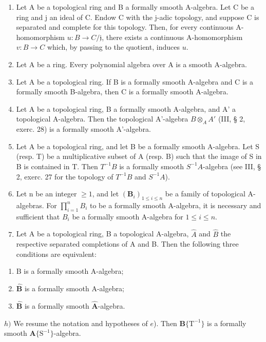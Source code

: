 \begin{enumerate}
\def\labelenumi{\alph{enumi})}
\item
  Let A be a topological ring and B a formally smooth A-algebra. Let C be a ring and j an ideal of C. Endow C with the j-adic topology, and suppose C is separated and complete for this topology. Then, for every continuous A-homomorphism \(u:B\to C/\mathfrak{j}\), there exists a continuous A-homomorphism \(v:B\to C\) which, by passing to the quotient, induces \(u\).
\item
  Let A be a ring. Every polynomial algebra over A is a smooth A-algebra.
\item
  Let A be a topological ring. If B is a formally smooth A-algebra and C is a formally smooth B-algebra, then C is a formally smooth A-algebra.
\item
  Let A be a topological ring, B a formally smooth A-algebra, and A' a topological A-algebra. Then the topological A'-algebra \(B \otimes_{A} A'\) (III, § 2, exerc. 28) is a formally smooth A'-algebra.
\item
  Let A be a topological ring, and let B be a formally smooth A-algebra. Let S (resp. T) be a multiplicative subset of A (resp. B) such that the image of S in B is contained in T. Then \(T^{-1}B\) is a formally smooth \(S^{-1}A\)-algebra (see III, § 2, exerc. 27 for the topology of \(T^{-1}B\) and \(S^{-1}A\)).
\item
  Let n be an integer \(\geqslant 1\), and let \((\mathbf{B}_{i})_{1\leqslant i\leqslant n}\) be a family of topological A-algebras. For \(\prod_{i=1}^{n} B_{i}\) to be a formally smooth A-algebra, it is necessary and sufficient that \(B_{i}\) be a formally smooth A-algebra for \(1 \leqslant i \leqslant n\).
\item
  Let A be a topological ring, B a topological A-algebra, \(\hat{A}\) and \(\hat{B}\) the respective separated completions of A and B. Then the following three conditions are equivalent:
\end{enumerate}

\begin{enumerate}
\def\labelenumi{(\roman{enumi})}
\item
  B is a formally smooth A-algebra;
\item
  \(\hat{\mathbf{B}}\) is a formally smooth A-algebra;
\item
  \(\hat{\mathbf{B}}\) is a formally smooth \(\hat{\mathbf{A}}\)-algebra.
\end{enumerate}

\(h)\) We resume the notation and hypotheses of \(e\)). Then \(\mathbf{B}\{\mathrm{T}^{-1}\}\) is a formally smooth \(\mathbf{A}\{\mathrm{S}^{-1}\}\)-algebra.

